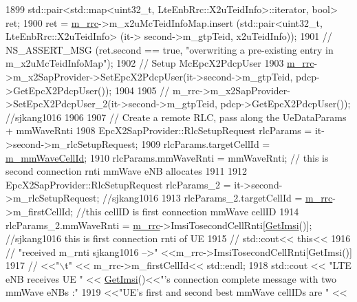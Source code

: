 \begin{DoxyCode}
1899           std::pair<std::map<uint32\_t, LteEnbRrc::X2uTeidInfo>::iterator, \textcolor{keywordtype}{bool}> ret;
1900           ret = \hyperlink{classns3_1_1UeManager_ab4405e9f354c66e7c1a4c95832290f5b}{m\_rrc}->m\_x2uMcTeidInfoMap.insert (std::pair<uint32\_t, LteEnbRrc::X2uTeidInfo> (it->
      second->m\_gtpTeid, x2uTeidInfo));
1901           \textcolor{comment}{// NS\_ASSERT\_MSG (ret.second == true, "overwriting a pre-existing entry in m\_x2uMcTeidInfoMap");}
1902           \textcolor{comment}{// Setup McEpcX2PdcpUser}
1903           \hyperlink{classns3_1_1UeManager_ab4405e9f354c66e7c1a4c95832290f5b}{m\_rrc}->m\_x2SapProvider->SetEpcX2PdcpUser(it->second->m\_gtpTeid, pdcp->GetEpcX2PdcpUser());
1904 
1905         \textcolor{comment}{//  m\_rrc->m\_x2SapProvider->SetEpcX2PdcpUser\_2(it->second->m\_gtpTeid, pdcp->GetEpcX2PdcpUser());
       //sjkang1016}
1906 
1907           \textcolor{comment}{// Create a remote RLC, pass along the UeDataParams + mmWaveRnti}
1908           EpcX2SapProvider::RlcSetupRequest rlcParams = it->second->m\_rlcSetupRequest;
1909           rlcParams.targetCellId = \hyperlink{classns3_1_1UeManager_a0f53cb816bd8a3ad6227dc9adca671b2}{m\_mmWaveCellId};
1910           rlcParams.mmWaveRnti = mmWaveRnti; \textcolor{comment}{// this is second connection rnti mmWave eNB allocates}
1911 
1912           EpcX2SapProvider::RlcSetupRequest rlcParams\_2 = it->second->m\_rlcSetupRequest; \textcolor{comment}{//sjkang1016}
1913            rlcParams\_2.targetCellId = \hyperlink{classns3_1_1UeManager_ab4405e9f354c66e7c1a4c95832290f5b}{m\_rrc}->m\_firstCellId; \textcolor{comment}{//this cellID is first connection mmWave
       cellID}
1914            rlcParams\_2.mmWaveRnti = \hyperlink{classns3_1_1UeManager_ab4405e9f354c66e7c1a4c95832290f5b}{m\_rrc}->ImsiTosecondCellRnti[\hyperlink{classns3_1_1UeManager_a9609913bb407b13da17a55d9013e8e10}{GetImsi}()]; \textcolor{comment}{//sjkang1016 this
       is first connection rnti of UE}
1915            \textcolor{comment}{// std::cout<< this<<}
1916           \textcolor{comment}{//    "received m\_rnti sjkang1016  -->" <<m\_rrc->ImsiTosecondCellRnti[GetImsi()]}
1917           \textcolor{comment}{//                                    <<"\(\backslash\)t" << m\_rrc->m\_firstCellId<< std::endl;}
1918          std::cout << \textcolor{stringliteral}{"LTE eNB receives UE "} << \hyperlink{classns3_1_1UeManager_a9609913bb407b13da17a55d9013e8e10}{GetImsi}()<<\textcolor{stringliteral}{"'s connection complete message with two
       mmWave eNBs :"}
1919                          <<\textcolor{stringliteral}{"UE's first and second best mmWave cellIDs are "} << 

\end{DoxyCode}
